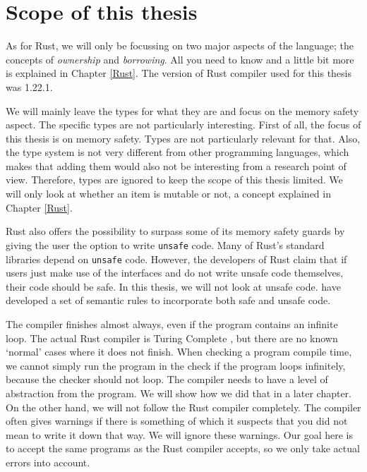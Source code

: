 



\section{Scope of this thesis}
As for Rust, we will only be focussing on two major aspects of the language; the concepts of \emph{ownership} and \emph{borrowing}. All you need to know and a little bit more is explained in Chapter \ref{Rust}. The version of Rust compiler used for this thesis was 1.22.1. 

We will mainly leave the types for what they are and focus on the memory safety aspect. The specific types are not particularly interesting. First of all, the focus of this thesis is on memory safety. Types are not particularly relevant for that. Also, the type system is not very different from other programming languages, which makes that adding them would also not be interesting from a research point of view. Therefore, types are ignored to keep the scope of this thesis limited. We will only look at whether an item is mutable or not, a concept explained in Chapter \ref{Rust}. 

Rust also offers the possibility to surpass some of its memory safety guards by giving the user the option to write \texttt{unsafe} code. Many of Rust's standard libraries depend on \texttt{unsafe} code. However, the developers of Rust claim that if users just make use of the interfaces and do not write unsafe code themselves, their code should be safe. In this thesis, we will not look at unsafe code. \cite{jung2017rustbelt} have developed a set of semantic rules to incorporate both safe and unsafe code. 

The compiler finishes almost always, even if the program contains an infinite loop. The actual Rust compiler is Turing Complete \citep{compiler}, but there are no known `normal' cases where it does not finish. When checking a program compile time, we cannot simply run the program in the check if the program loops infinitely, because the checker should not loop. The compiler needs to have a level of abstraction from the program. We will show how we did that in a later chapter. On the other hand, we will not follow the Rust compiler completely. The compiler often gives warnings if there is something of which it suspects that you did not mean to write it down that way. We will ignore these warnings. Our goal here is to accept the same programs as the Rust compiler accepts, so we only take actual errors into account. 


